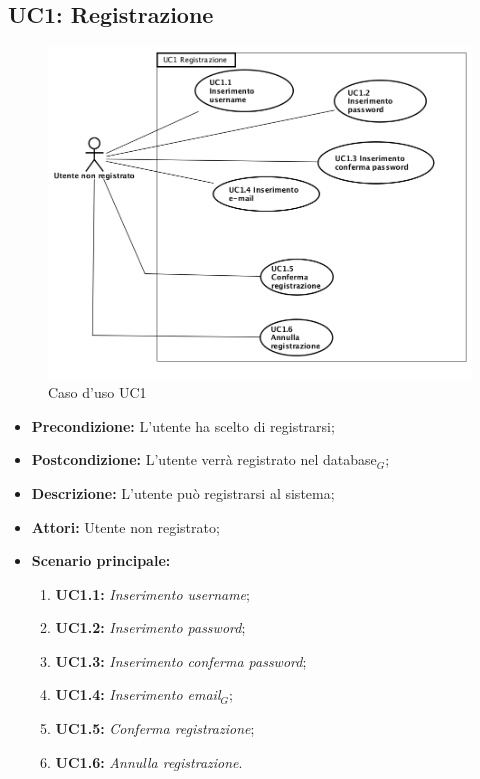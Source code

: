 \subsection{ UC1: Registrazione}

\begin{figure}[h]
	\begin{center}
	\includegraphics[scale=0.4]{diagram/UC1.png}
	\caption{Caso d'uso UC1}
	\end{center}
\end{figure}
\begin{itemize}
	\item \textbf{Precondizione:} L'utente ha scelto di registrarsi;
	\item \textbf{Postcondizione:} L'utente verrà registrato nel database$_G$;
	\item \textbf{Descrizione:} L'utente può registrarsi al sistema;
	\item \textbf{Attori:} Utente non registrato;
	\item \textbf{Scenario principale:}
	\begin{enumerate}
		\item \textbf{ UC1.1:} \textit{ Inserimento username};
		\item \textbf{ UC1.2:} \textit{ Inserimento password};
		\item \textbf{ UC1.3:} \textit{ Inserimento conferma password};
		\item \textbf{ UC1.4:} \textit{ Inserimento email$_G$};
		\item \textbf{ UC1.5:} \textit{ Conferma registrazione};
		\item \textbf{ UC1.6:} \textit{ Annulla registrazione}.
	\end{enumerate}
\end{itemize}
